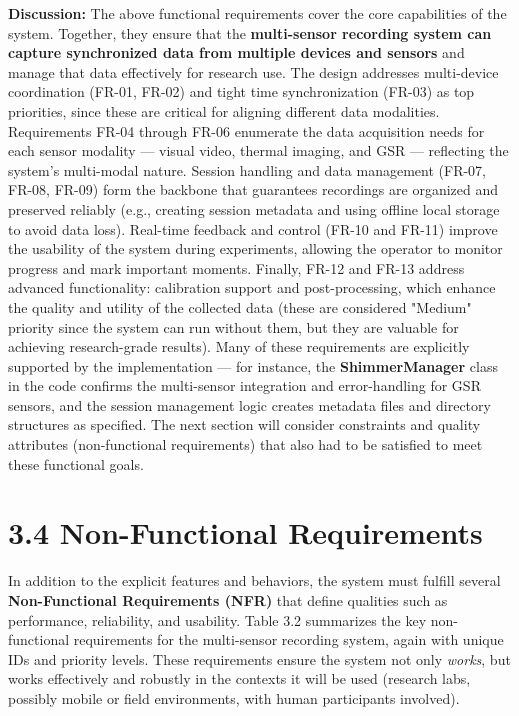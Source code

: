 \textbf{Discussion:} The above functional requirements cover the core
capabilities of the system. Together, they ensure that the
\textbf{multi-sensor recording system can capture synchronized data from
multiple devices and sensors} and manage that data effectively for
research use. The design addresses multi-device coordination (FR-01,
FR-02) and tight time synchronization (FR-03) as top priorities, since
these are critical for aligning different data modalities. Requirements
FR-04 through FR-06 enumerate the data acquisition needs for each sensor
modality --- visual video, thermal imaging, and GSR --- reflecting the
system's multi-modal nature. Session handling and data management
(FR-07, FR-08, FR-09) form the backbone that guarantees recordings are
organized and preserved reliably (e.g., creating session metadata and
using offline local storage to avoid data loss). Real-time feedback and
control (FR-10 and FR-11) improve the usability of the system during
experiments, allowing the operator to monitor progress and mark
important moments. Finally, FR-12 and FR-13 address advanced
functionality: calibration support and post-processing, which enhance
the quality and utility of the collected data (these are considered
"Medium" priority since the system can run without them, but they are
valuable for achieving research-grade results). Many of these
requirements are explicitly supported by the implementation --- for
instance, the \textbf{ShimmerManager} class in the code confirms the
multi-sensor integration and error-handling for GSR
sensors\cite{AppleHealthWatch2019}\cite{Boucsein2012},
and the session management logic creates metadata files and directory
structures as
specified\cite{SamsungHealth2020}\cite{Fowles1981}.
The next section will consider constraints and quality attributes
(non-functional requirements) that also had to be satisfied to meet
these functional goals.

\section{3.4 Non-Functional Requirements}

In addition to the explicit features and behaviors, the system must
fulfill several \textbf{Non-Functional Requirements (NFR)} that define
qualities such as performance, reliability, and usability. Table 3.2
summarizes the key non-functional requirements for the multi-sensor
recording system, again with unique IDs and priority levels. These
requirements ensure the system not only \textit{works}, but works effectively
and robustly in the contexts it will be used (research labs, possibly
mobile or field environments, with human participants involved).

